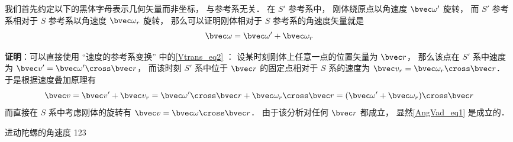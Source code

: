 

我们首先约定以下的黑体字母表示几何矢量而非坐标， 与参考系无关． 在 $S'$ 参考系中， 刚体绕原点以角速度 $\bvec \omega'$ 旋转， 而 $S'$ 参考系相对于 $S$ 参考系以角速度 $\bvec \omega_r$ 旋转， 那么可以证明刚体相对于 $S$ 参考系的角速度矢量就是
\begin{equation}\label{AngVad_eq1}
\bvec \omega = \bvec \omega' + \bvec \omega_r
\end{equation}

\textbf{证明}：可以直接使用 “速度的参考系变换” 中的\autoref{Vtrans_eq2} ： 设某时刻刚体上任意一点的位置矢量为 $\bvec r$， 那么该点在 $S'$ 系中速度为 $\bvec v' = \bvec\omega'\cross\bvec r$， 而该时刻 $S'$ 系中位于 $\bvec r$ 的固定点相对于 $S$ 系的速度为 $\bvec v_r = \bvec\omega_r\cross\bvec r$． 于是根据速度叠加原理有
\begin{equation}
\bvec v = \bvec v' + \bvec v_r = \bvec\omega'\cross\bvec r + \bvec\omega_r\cross\bvec r
= (\bvec\omega' + \bvec\omega_r)\cross\bvec r
\end{equation}
而直接在 $S$ 系中考虑刚体的旋转有 $\bvec v = \bvec\omega\cross\bvec r$． 由于该分析对任何 $\bvec r$ 都成立， 显然\autoref{AngVad_eq1} 是成立的．

\begin{example}{进动陀螺的角速度}\label{AngVad_ex1}
123
\end{example}

